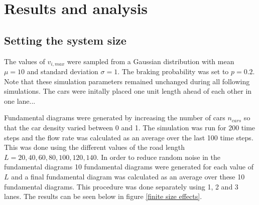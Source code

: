 \documentclass[a4paper,12pt]{article}
\begin{document}
\section*{Results and analysis}
\subsection*{Setting the system size}
The values of $v_{i,max}$ were sampled from a Gaussian distribution with mean $\mu = 10$ and standard deviation $\sigma = 1$. The braking probability
was set to $p=0.2$. Note that these simulation parameters remained unchanged during all following simulations. The cars were initally placed one unit length ahead 
of each other in one lane... %

Fundamental diagrams were generated by increasing the number of cars $n_{cars}$ so that the car density varied between 0 and 1. 
The simulation was run for 200 time steps and the flow rate was calculated as an average over the last 100 time steps.
This was done using the different values of the road length $L=20, 40, 60, 80, 100, 120, 140$. In order to reduce random noise in the fundamental diagrams
10 fundamental diagrams were generated for each value of $L$ and a final fundamental diagram was calculated as an average over these 10 fundamental diagrams.
This procedure was done separately using 1, 2 and 3 lanes.
The results can be seen below in figure \ref*{finite size effects}.
\end{document}

